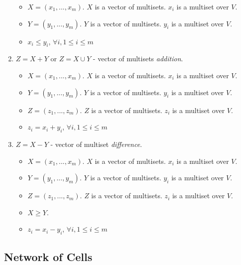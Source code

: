 \documentclass{article}
\begin{document}
\begin{appendices}
\begin{enumerate}
         \begin{itemize}
         \item $X = (x_1,...,x_m)$. $X$ is a vector of multisets. $x_i$ is a multiset over $V$.
         \item $Y = (y_1,...,y_m)$. $Y$ is a vector of multisets. $y_i$ is a multiset over $V$.
         \item $x_i \leq y_i$, $\forall i, 1 \leq i \leq m$
         \end{itemize}
   \item $Z = X + Y$ or $Z = X \cup Y$ - vector of multisets \emph{addition}.
         \begin{itemize}
         \item $X = (x_1,...,x_m)$. $X$ is a vector of multisets. $x_i$ is a multiset over $V$.
         \item $Y = (y_1,...,y_m)$. $Y$ is a vector of multisets. $y_i$ is a multiset over $V$.
         \item $Z = (z_1,...,z_m)$. $Z$ is a vector of multisets. $z_i$ is a multiset over $V$.
         \item $z_i = x_i + y_i$, $\forall i, 1 \leq i \leq m$
         \end{itemize}
   \item $Z = X - Y$ - vector of multiset \emph{difference}.
         \begin{itemize}
         \item $X = (x_1,...,x_m)$. $X$ is a vector of multisets. $x_i$ is a multiset over $V$.
         \item $Y = (y_1,...,y_m)$. $Y$ is a vector of multisets. $y_i$ is a multiset over $V$.
         \item $Z = (z_1,...,z_m)$. $Z$ is a vector of multisets. $z_i$ is a multiset over $V$.
         \item $X \geq Y$.
         \item $z_i = x_i - y_i$, $\forall i, 1 \leq i \leq m$
         \end{itemize}

\end{enumerate}


\subsection{Network of Cells} \label{a-ff1-net-cells}


\end{appendices}
\end{document}
